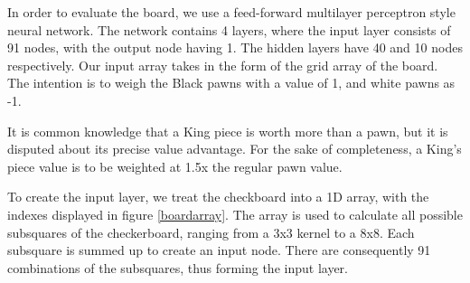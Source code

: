 \documentclass[12pt,a4paper]{article}
\begin{document}
    In order to evaluate the board, we use a feed-forward multilayer perceptron style neural network. The network contains 4 layers, where the input layer consists of 91 nodes, with the output node having 1. The hidden layers have 40 and 10 nodes respectively. Our input array takes in the form of the grid array of the board. The intention is to weigh the Black pawns with a value of 1, and white pawns as -1. 
    
    It is common knowledge that a King piece is worth more than a pawn, but it is disputed about its precise value advantage. For the sake of completeness, a King's piece value is to be weighted at 1.5x the regular pawn value. 

    To create the input layer, we treat the checkboard into a 1D array, with the indexes displayed in figure \ref{boardarray}. The array is used to calculate all possible subsquares of the checkerboard, ranging from a 3x3 kernel to a 8x8. Each subsquare is summed up to create an input node. There are consequently 91 combinations of the subsquares, thus forming the input layer. 



    

    
\end{document}
